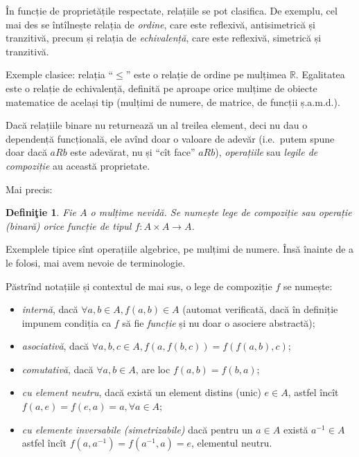 \documentclass[11pt,a4paper]{article}
\newcommand\qq{\enquote}
\newcommand\RR{\mathbb{R}}
\theoremstyle{dotless}
\theoremstyle{dotlessdr}
\newtheorem{definition}{Defini\c{t}ie}[section]
\begin{document}
În funcție de proprietățile respectate, relațiile se pot clasifica. De exemplu, cel mai des
se întîlnește relația de \emph{ordine}, care este reflexivă, antisimetrică și tranzitivă,
precum și relația de \emph{echivalență}, care este reflexivă, simetrică și tranzitivă.

Exemple clasice: relația \qq{$\leq$} este o relație de ordine pe mulțimea $\RR$. Egalitatea
este o relație de echivalență, definită pe aproape orice mulțime de obiecte matematice de
același tip (mulțimi de numere, de matrice, de funcții ș.a.m.d.).

\vspace{1cm}

Dacă relațiile binare nu returnează un al treilea element, deci nu dau o dependență funcțională,
ele avînd doar o valoare de adevăr (i.e.\ putem spune doar dacă $aRb$ este adevărat, nu și
\qq{cît face} $a R b$), \emph{operațiile} sau \emph{legile de compoziție} au această proprietate.

Mai precis:

\begin{definition}\label{def:lege-comp}
  Fie $A$ o mulțime nevidă. Se numește \emph{lege de compoziție} sau \emph{operație (binară)} orice
  funcție de tipul $f : A \times A \to A$.
\end{definition}

Exemplele tipice sînt operațiile algebrice, pe mulțimi de numere. Însă înainte de a le folosi,
mai avem nevoie de terminologie.

Păstrînd notațiile și contextul de mai sus, o lege de compoziție $f$ se numește:
\begin{itemize}
  \item \emph{internă}, dacă $\forall a, b \in A, f(a, b) \in A$ (automat verificată, dacă
    în definiție impunem condiția ca $f$ să fie \emph{funcție} și nu doar o asociere abstractă);
  \item \emph{asociativă}, dacă $\forall a, b, c \in A, f(a, f(b, c)) = f(f(a, b), c)$;
  \item \emph{comutativă}, dacă $\forall a, b \in A$, are loc $f(a, b) = f(b, a)$;
  \item \emph{cu element neutru}, dacă există un element distins (unic) $e \in A$, astfel încît
    $f(a, e) = f(e, a) = a, \forall a \in A$;
  \item \emph{cu elemente inversabile (simetrizabile)} dacă pentru un $a \in A$ există $a^{-1} \in A$
    astfel încît $f(a, a^{-1}) = f(a^{-1}, a) = e$, elementul neutru.
\end{itemize}
\end{document}
